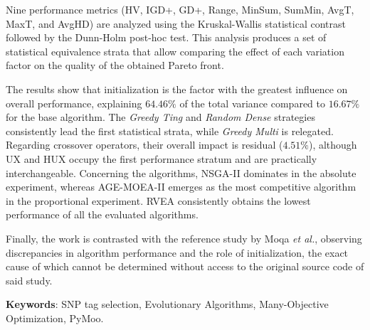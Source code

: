 \documentclass[minitoc, hidelinks, headlogo, framedcover]{tfeEPCC}
\begin{document}
Nine performance metrics (HV, IGD+, GD+, Range, MinSum, SumMin, AvgT, MaxT, and AvgHD) are analyzed using the Kruskal-Wallis statistical contrast followed by the Dunn-Holm post-hoc test. This analysis produces a set of statistical equivalence strata that allow comparing the effect of each variation factor on the quality of the obtained Pareto front.

The results show that initialization is the factor with the greatest influence on overall performance, explaining $64.46\%$ of the total variance compared to $16.67\%$ for the base algorithm. The \textit{Greedy Ting} and \textit{Random Dense} strategies consistently lead the first statistical strata, while \textit{Greedy Multi} is relegated. Regarding crossover operators, their overall impact is residual ($4.51\%$), although UX and HUX occupy the first performance stratum and are practically interchangeable. Concerning the algorithms, NSGA-II dominates in the absolute experiment, whereas AGE-MOEA-II emerges as the most competitive algorithm in the proportional experiment. RVEA consistently obtains the lowest performance of all the evaluated algorithms.

Finally, the work is contrasted with the reference study by Moqa \textit{et al.}, observing discrepancies in algorithm performance and the role of initialization, the exact cause of which cannot be determined without access to the original source code of said study.

\noindent\textbf{Keywords}: SNP tag selection, Evolutionary Algorithms, Many-Objective Optimization, PyMoo.

\newpage
\pagestyle{plain}
\setcounter{page}{1}
\tableofcontents
\newpage
\listoftables
\newpage
\listoffigures
\newpage
\end{document}
